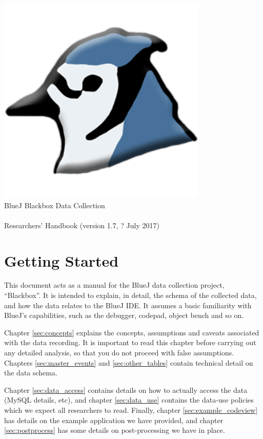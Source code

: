 \documentclass{report}
\begin{document}
\begin{titlepage}
  \begin{center}
    \includegraphics[width=10cm]{../../lib/images/bluej-icon-256.png}\\
    \huge BlueJ Blackbox Data Collection\\~\\Researchers' Handbook
    (version 1.7, ? July 2017)
  \end{center}
\end{titlepage}

\section*{Getting Started}

This document acts as a manual for the BlueJ data collection project,
``Blackbox''.  It is intended to explain, in detail, the schema of the
collected data, and how the data relates to the BlueJ IDE.  It assumes a basic
familiarity with BlueJ's capabilities, such as the debugger, codepad, object
bench and so on.

Chapter \ref{sec:concepts} explains the concepts, assumptions and caveats
associated with the data recording.  It is important to read this chapter
before carrying out any detailed analysis, so that you do not proceed with
false assumptions.  Chapters \ref{sec:master_events} and
\ref{sec:other_tables} contain technical detail on the data schema.

Chapter \ref{sec:data_access} contains details on how to actually access the
data (MySQL details, etc), and chapter \ref{sec:data_use} contains the
data-use policies which we expect all researchers to read.  Finally, chapter
\ref{sec:example_codeview} has details on the example application we have
provided, and chapter \ref{sec:postprocess} has some details on
post-processing we have in place.
\end{document}
